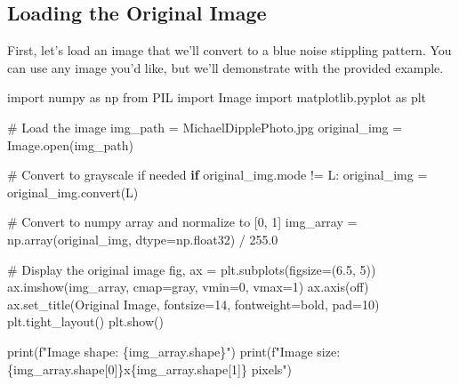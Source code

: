 \documentclass[
  letterpaper,
  DIV=11,
  numbers=noendperiod]{scrartcl}
\newenvironment{Shaded}{\begin{snugshade}}{\end{snugshade}}
\newcommand{\BuiltInTok}[1]{\textcolor[rgb]{0.00,0.23,0.31}{#1}}
\newcommand{\CommentTok}[1]{\textcolor[rgb]{0.37,0.37,0.37}{#1}}
\newcommand{\ControlFlowTok}[1]{\textcolor[rgb]{0.00,0.23,0.31}{\textbf{#1}}}
\newcommand{\DecValTok}[1]{\textcolor[rgb]{0.68,0.00,0.00}{#1}}
\newcommand{\FloatTok}[1]{\textcolor[rgb]{0.68,0.00,0.00}{#1}}
\newcommand{\ImportTok}[1]{\textcolor[rgb]{0.00,0.46,0.62}{#1}}
\newcommand{\NormalTok}[1]{\textcolor[rgb]{0.00,0.23,0.31}{#1}}
\newcommand{\OperatorTok}[1]{\textcolor[rgb]{0.37,0.37,0.37}{#1}}
\newcommand{\SpecialCharTok}[1]{\textcolor[rgb]{0.37,0.37,0.37}{#1}}
\newcommand{\SpecialStringTok}[1]{\textcolor[rgb]{0.13,0.47,0.30}{#1}}
\newcommand{\StringTok}[1]{\textcolor[rgb]{0.13,0.47,0.30}{#1}}
\begin{document}
\subsection{Loading the Original
Image}\label{loading-the-original-image}

First, let's load an image that we'll convert to a blue noise stippling
pattern. You can use any image you'd like, but we'll demonstrate with
the provided example.

\begin{Shaded}
\begin{Highlighting}[]
\ImportTok{import}\NormalTok{ numpy }\ImportTok{as}\NormalTok{ np}
\ImportTok{from}\NormalTok{ PIL }\ImportTok{import}\NormalTok{ Image}
\ImportTok{import}\NormalTok{ matplotlib.pyplot }\ImportTok{as}\NormalTok{ plt}

\CommentTok{\# Load the image}
\NormalTok{img\_path }\OperatorTok{=} \StringTok{\textquotesingle{}MichaelDipplePhoto.jpg\textquotesingle{}}
\NormalTok{original\_img }\OperatorTok{=}\NormalTok{ Image.}\BuiltInTok{open}\NormalTok{(img\_path)}

\CommentTok{\# Convert to grayscale if needed}
\ControlFlowTok{if}\NormalTok{ original\_img.mode }\OperatorTok{!=} \StringTok{\textquotesingle{}L\textquotesingle{}}\NormalTok{:}
\NormalTok{    original\_img }\OperatorTok{=}\NormalTok{ original\_img.convert(}\StringTok{\textquotesingle{}L\textquotesingle{}}\NormalTok{)}

\CommentTok{\# Convert to numpy array and normalize to [0, 1]}
\NormalTok{img\_array }\OperatorTok{=}\NormalTok{ np.array(original\_img, dtype}\OperatorTok{=}\NormalTok{np.float32) }\OperatorTok{/} \FloatTok{255.0}

\CommentTok{\# Display the original image}
\NormalTok{fig, ax }\OperatorTok{=}\NormalTok{ plt.subplots(figsize}\OperatorTok{=}\NormalTok{(}\FloatTok{6.5}\NormalTok{, }\DecValTok{5}\NormalTok{))}
\NormalTok{ax.imshow(img\_array, cmap}\OperatorTok{=}\StringTok{\textquotesingle{}gray\textquotesingle{}}\NormalTok{, vmin}\OperatorTok{=}\DecValTok{0}\NormalTok{, vmax}\OperatorTok{=}\DecValTok{1}\NormalTok{)}
\NormalTok{ax.axis(}\StringTok{\textquotesingle{}off\textquotesingle{}}\NormalTok{)}
\NormalTok{ax.set\_title(}\StringTok{\textquotesingle{}Original Image\textquotesingle{}}\NormalTok{, fontsize}\OperatorTok{=}\DecValTok{14}\NormalTok{, fontweight}\OperatorTok{=}\StringTok{\textquotesingle{}bold\textquotesingle{}}\NormalTok{, pad}\OperatorTok{=}\DecValTok{10}\NormalTok{)}
\NormalTok{plt.tight\_layout()}
\NormalTok{plt.show()}

\BuiltInTok{print}\NormalTok{(}\SpecialStringTok{f"Image shape: }\SpecialCharTok{\{}\NormalTok{img\_array}\SpecialCharTok{.}\NormalTok{shape}\SpecialCharTok{\}}\SpecialStringTok{"}\NormalTok{)}
\BuiltInTok{print}\NormalTok{(}\SpecialStringTok{f"Image size: }\SpecialCharTok{\{}\NormalTok{img\_array}\SpecialCharTok{.}\NormalTok{shape[}\DecValTok{0}\NormalTok{]}\SpecialCharTok{\}}\SpecialStringTok{x}\SpecialCharTok{\{}\NormalTok{img\_array}\SpecialCharTok{.}\NormalTok{shape[}\DecValTok{1}\NormalTok{]}\SpecialCharTok{\}}\SpecialStringTok{ pixels"}\NormalTok{)}
\end{Highlighting}
\end{Shaded}
\end{document}
